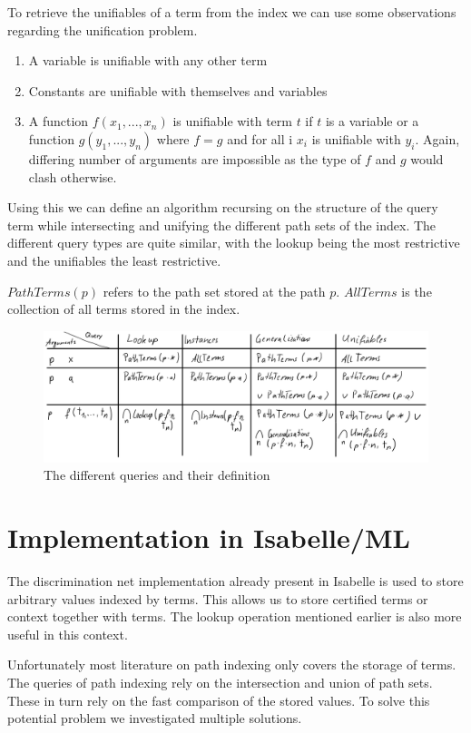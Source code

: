 To retrieve the unifiables of a term from the index we can use some observations regarding the unification problem.
\begin{enumerate}
  \item A variable is unifiable with any other term
  \item Constants are unifiable with themselves and variables
  \item A function $f(x_{1},...,x_{n})$ is unifiable with term $t$ if $t$ is a variable or a function $g(y_{1},...,y_{n})$ where $f = g$ and for all i $x_{i}$ is unifiable with $y_{i}$. Again, differing number of arguments are impossible as the type of $f$ and $g$ would clash otherwise.
\end{enumerate}
Using this we can define an algorithm recursing on the structure of the query term while intersecting and unifying the different path sets of the index. The different query types are quite similar, with the lookup being the most restrictive and the unifiables the least restrictive.

$PathTerms(p)$ refers to the path set stored at the path $p$. $AllTerms$ is the collection of all terms stored in the index.
\begin{figure}[h]
\centering
\includegraphics[scale=0.25]{figures/queries.png}
\caption{The different queries and their definition}
\end{figure}

\section{Implementation in Isabelle/ML}
The discrimination net implementation already present in Isabelle is used to store arbitrary values indexed by terms. This allows us to store certified terms or context together with terms. The lookup operation mentioned earlier is also more useful in this context.

Unfortunately most literature on path indexing only covers the storage of terms. The queries of path indexing rely on the intersection and union of path sets. These in turn rely on the fast comparison of the stored values. To solve this potential problem we investigated multiple solutions.

